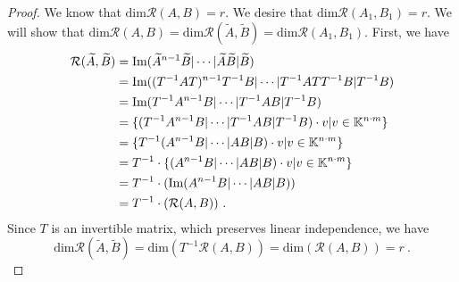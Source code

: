 \begin{proof}
	We know that $\text{dim}\mathcal{R}(A,B)=r$. We desire that $\text{dim}\mathcal{R}(A_1,B_1)=r$. We will show that $\text{dim}\mathcal{R}(A,B)=\text{dim}\mathcal{R}(\widetilde{A},\widetilde{B})=\text{dim}\mathcal{R}(A_1,B_1)$. 
	First, we have 
	\begin{align*}
		\mathcal{R}(\widetilde{A},\widetilde{B})&=\text{Im}(\widetilde{A}^{n-1}\widetilde{B}|\cdots|\widetilde{A}\widetilde{B}|\widetilde{B}) \\
		&=\text{Im}((T^{-1}AT)^{n-1}T^{-1}B|\cdots|T^{-1}ATT^{-1}B|T^{-1}B) \\
		&=\text{Im}(T^{-1}A^{n-1}B|\cdots|T^{-1}AB|T^{-1}B) \\
		&=\{(T^{-1}A^{n-1}B|\cdots|T^{-1}AB|T^{-1}B)\cdot v | v \in \mathbb{K}^{n\cdot m}\} \\
		&=\{T^{-1}(A^{n-1}B|\cdots|AB|B)\cdot v | v \in \mathbb{K}^{n\cdot m}\} \\
		&=T^{-1}\cdot\{(A^{n-1}B|\cdots|AB|B)\cdot v | v \in \mathbb{K}^{n\cdot m}\} \\
		&=T^{-1}\cdot(\text{Im}(A^{n-1}B|\cdots|AB|B)) \\
		&=T^{-1}\cdot(\mathcal{R}(A,B))
		\ .
	\end{align*}
	Since $T$ is an invertible matrix, which preserves linear independence, we have
	$$\text{dim}\mathcal{R}(\widetilde{A},\widetilde{B})=\text{dim}(T^{-1}\mathcal{R}(A,B))=\text{dim}(\mathcal{R}(A,B))=r\ .$$


\end{proof}
